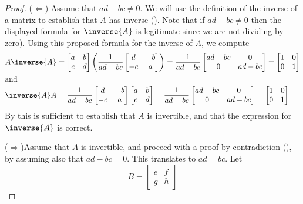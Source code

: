 %
\begin{proof}
%
($\Leftarrow$) Assume that $ad-bc\neq 0$.  We will use the definition of the inverse of a matrix to establish that $A$ has inverse ().  Note that if $ad-bc\neq 0$ then the displayed formula for $\inverse{A}$ is legitimate since we are not dividing by zero).  Using this proposed formula for the inverse of $A$, we compute
%
\begin{align*}
A\inverse{A}
&=
\begin{bmatrix}a&b\\c&d\end{bmatrix}
\left(\frac{1}{ad-bc}
\begin{bmatrix}d&-b\\-c&a\end{bmatrix}
\right)
=
\frac{1}{ad-bc}
\begin{bmatrix}ad-bc&0\\0&ad-bc\end{bmatrix}
=
\begin{bmatrix}1&0\\0&1\end{bmatrix}\\
%
\intertext{and}
%
\inverse{A}A
&=
\frac{1}{ad-bc}
\begin{bmatrix}d&-b\\-c&a\end{bmatrix}
\begin{bmatrix}a&b\\c&d\end{bmatrix}
%
=
\frac{1}{ad-bc}
\begin{bmatrix}ad-bc&0\\0&ad-bc\end{bmatrix}
=
\begin{bmatrix}1&0\\0&1\end{bmatrix}
\end{align*}
%
By  this is sufficient to establish that $A$ is invertible, and that the expression for $\inverse{A}$ is correct.\par
%
($\Rightarrow$)\quad Assume that $A$ is invertible, and proceed with a proof by contradiction (), by assuming also that $ad-bc=0$.  This translates to $ad=bc$.  Let 
%
\begin{equation*}
B=
\begin{bmatrix}
e&f\\
g&h
\end{bmatrix}
\end{equation*}

\end{proof}

